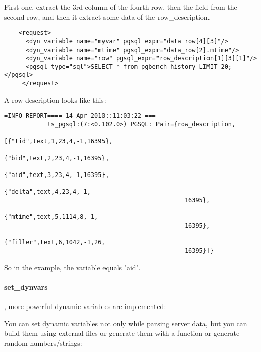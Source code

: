 \documentclass{TSUNG-en}
\begin{document}
First one, extract the 3rd column of the fourth row, then the 
field from the second row, and then it extract some data of the
row\_description.

\begin{Verbatim}
    <request>
      <dyn_variable name="myvar" pgsql_expr="data_row[4][3]"/>
      <dyn_variable name="mtime" pgsql_expr="data_row[2].mtime"/>
      <dyn_variable name="row" pgsql_expr="row_description[1][3][1]"/>
      <pgsql type="sql">SELECT * from pgbench_history LIMIT 20;</pgsql>
     </request>
\end{Verbatim}

A row description looks like this:
\begin{Verbatim}
=INFO REPORT==== 14-Apr-2010::11:03:22 ===
            ts_pgsql:(7:<0.102.0>) PGSQL: Pair={row_description,
                                                [{"tid",text,1,23,4,-1,16395},
                                                 {"bid",text,2,23,4,-1,16395},
                                                 {"aid",text,3,23,4,-1,16395},
                                                 {"delta",text,4,23,4,-1,
                                                  16395},
                                                 {"mtime",text,5,1114,8,-1,
                                                  16395},
                                                 {"filler",text,6,1042,-1,26,
                                                  16395}]}
\end{Verbatim}

So in the example, the  variable equals "aid".

\paragraph{set\_dynvars}

, more powerful dynamic variables are implemented:

You can set dynamic variables not only while parsing server data, but
you can build them using external files or generate them with a function
or generate random numbers/strings:
\end{document}
